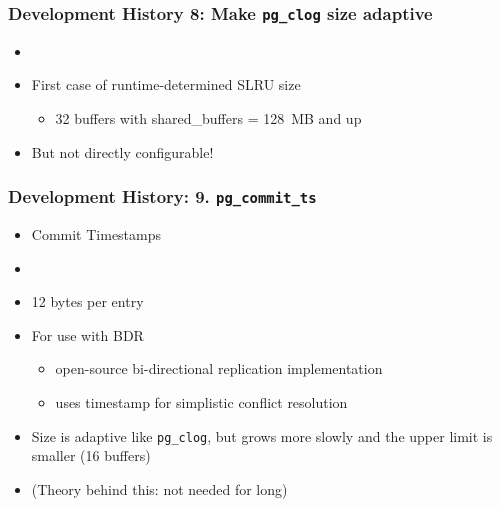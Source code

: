 \begin{frame}
  \frametitle{Development History 8: Make \texttt{pg\_clog} size adaptive}
  \begin{itemize}
     \item {}
     \item First case of runtime-determined SLRU size
     \begin{itemize}
       \item 32 buffers with shared\_buffers = 128~MB and up
     \end{itemize}
   \item But not directly configurable!
  \end{itemize}
\end{frame}

\begin{frame}
  \frametitle{Development History: 9. \texttt{pg\_commit\_ts}}
  \begin{itemize}
    \item Commit Timestamps
     \item {}
     \item 12 bytes per entry
     \item For use with BDR
       \begin{itemize}
	 \item open-source bi-directional replication implementation
	 \item uses timestamp for simplistic conflict resolution
       \end{itemize}
     \item Size is adaptive like \texttt{pg\_clog}, but grows more slowly and the upper limit is smaller (16 buffers)
     \item (Theory behind this: not needed for long)
  \end{itemize}
\end{frame}

